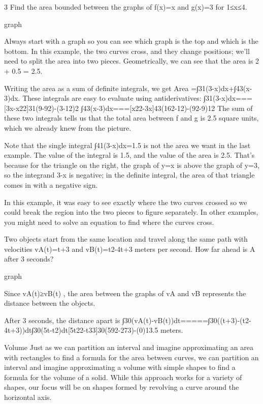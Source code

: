 \begin{example}  3
Find the area bounded between the graphs of f(x)=x and g(x)=3 for 1≤x≤4.

graph
\begin{solution}
Always start with a graph so you can see which graph is the top and which is the bottom. In this example, the two curves cross, and they change positions; we’ll need to split the area into two pieces. Geometrically, we can see that the area is 2 + 0.5 = 2.5.

Writing the area as a sum of definite integrals, we get
Area =∫31(3-x)dx+∫43(x-3)dx.
These integrals are easy to evaluate using antiderivatives:
∫31(3-x)dx===[3x-x22]31(9-92)-(3-12)2
∫43(x-3)dx===[x22-3x]43(162-12)-(92-9)12
The sum of these two integrals tells us that the total area between f and g is 2.5 square units, which we already knew from the picture.
\end{solution}\end{example}

Note that the single integral ∫41(3-x)dx=1.5 is not the area we want in the last example. The value of the integral is 1.5, and the value of the area is 2.5. That's because for the triangle on the right, the graph of y=x is above the graph of y=3, so the integrand 3-x is negative; in the definite integral, the area of that triangle comes in with a negative sign.

In this example, it was easy to see exactly where the two curves crossed so we could break the region into the two pieces to figure separately. In other examples, you might need to solve an equation to find where the curves cross.

\begin{example}
Two objects start from the same location and travel along the same path with velocities vA(t)=t+3 and vB(t)=t2-4t+3 meters per second. How far ahead is A after 3 seconds?

graph
\begin{solution}
Since vA(t)≥vB(t) , the area between the graphs of vA and vB represents the distance between the objects.

After 3 seconds, the distance apart is
∫30(vA(t)-vB(t))dt=====∫30((t+3)-(t2-4t+3))dt∫30(5t-t2)dt[5t22-t33]30(592-273)-(0)13.5 meters.
\end{solution}\end{example}

Volume
Just as we can partition an interval and imagine approximating an area with rectangles to find a formula for the area between curves, we can partition an interval and imagine approximating a volume with simple shapes to find a formula for the volume of a solid. While this approach works for a variety of shapes, our focus will be on shapes formed by revolving a curve around the horizontal axis.

